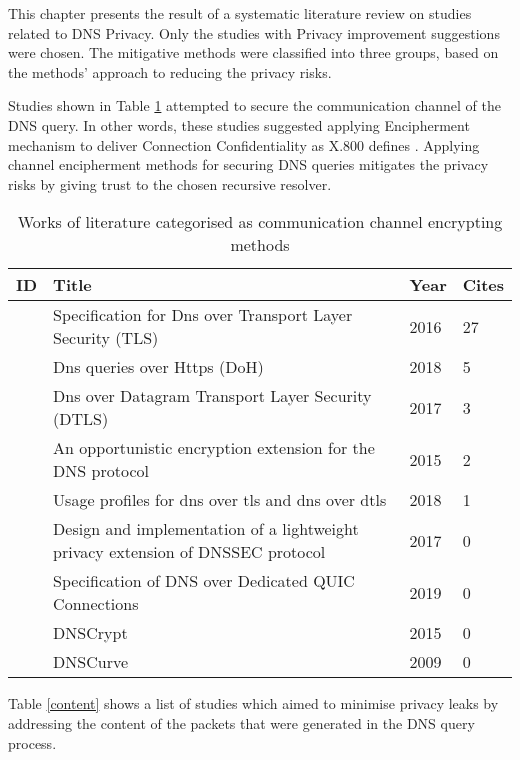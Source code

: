 This chapter presents the result of a systematic literature review on studies related to DNS Privacy. Only the studies with Privacy improvement suggestions were chosen.
The mitigative methods were classified into three groups, based on the methods' approach to reducing the privacy risks.

Studies shown in Table \ref{channel} attempted to secure the communication channel of the DNS query.
In other words, these studies suggested applying Encipherment mechanism to deliver Connection Confidentiality as X.800 defines \cite{x800}.
Applying channel encipherment methods for securing DNS queries mitigates the privacy risks by giving trust to the chosen recursive resolver.

\begin{table}[h!]
    \begin{tabular}{ | l | p{10.5cm} | l | l | }
        \hline
            ID & Title & Year & Cites  \\ \hline
            \cite{rfc7858} & Specification for Dns over Transport Layer Security (TLS) & 2016 & 27 \\ \hline
            \cite{rfc8484} & Dns queries over Https (DoH) & 2018 & 5\\ \hline
            \cite{rfc8094} & Dns over Datagram Transport Layer Security (DTLS) & 2017 & 3\\ \hline
            \cite{bucuti2015opportunistic} & An opportunistic encryption extension for the DNS protocol & 2015 & 2 \\ \hline
            \cite{rfc8310} & Usage profiles for dns over tls and dns over dtls & 2018 & 1 \\ \hline
            \cite{saraj2017design} & Design and implementation of a lightweight privacy extension of DNSSEC protocol & 2017 & 0 \\ \hline
            \cite{dnsoquic} & Specification of DNS over Dedicated QUIC Connections & 2019 & 0 \\ \hline
            \cite{denis2015dnscrypt} & DNSCrypt & 2015 & 0 \\ \hline
            \cite{dempsky2010dnscurve} & DNSCurve & 2009 & 0 \\ \hline
        \end{tabular}
        \caption{Works of literature categorised as communication channel encrypting methods}
\label{channel}
\end{table}

Table \ref{content} shows a list of studies which aimed to minimise privacy leaks by addressing the content of the packets that were generated in the DNS query process.

